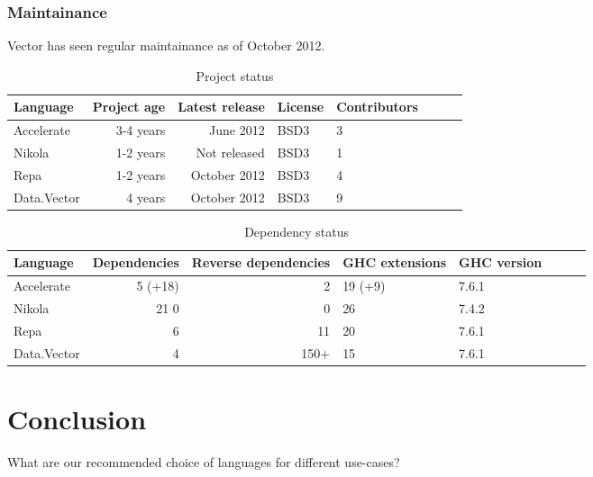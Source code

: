 \subsection{Maintainance} Vector has seen regular maintainance as of October 2012.

\begin{table}
  \centering
  \begin{tabular}{l|rrllllr}
    Language    & Project age & Latest release & License & Contributors \\ \hline
    Accelerate  & 3-4 years   & June 2012      & BSD3    & 3 \\
    Nikola      & 1-2 years   & Not released   & BSD3    & 1 \\
    Repa        & 1-2 years   & October 2012   & BSD3    & 4 \\
    Data.Vector & 4 years     & October 2012   & BSD3    & 9 \\
  \end{tabular}
  \caption{Project status}
  \label{tab:project_status}
\end{table}

\begin{table}
  \centering
  \begin{tabular}{l|rrllllr}
    Language    & Dependencies & Reverse dependencies & GHC extensions & GHC version \\ \hline
    Accelerate  & 5 (+18)      & 2                    & 19 (+9)        & 7.6.1 \\
    Nikola      & 21 0         & 0                    & 26             & 7.4.2 \\
    Repa        & 6            & 11                   & 20             & 7.6.1 \\
    Data.Vector & 4            & 150+                 & 15             & 7.6.1 \\
  \end{tabular}
  \caption{Dependency status}
  \label{tab:dependency_status}
\end{table}




\chapter{Conclusion}
What are our recommended choice of languages for different use-cases?


